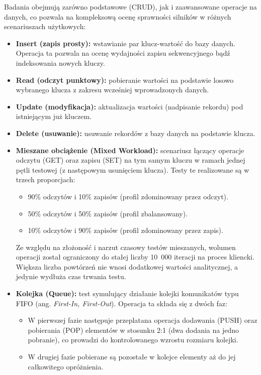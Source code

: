 Badania obejmują zarówno podstawowe (CRUD), jak i zaawansowane operacje na danych, co pozwala na kompleksową ocenę sprawności silników w różnych scenariuszach użytkowych:
\begin{itemize}
    \item \textbf{Insert (zapis prosty):} wstawianie par klucz-wartość do bazy danych. Operacja ta pozwala na ocenę wydajności zapisu sekwencyjnego bądź indeksowania nowych kluczy.
    \item \textbf{Read (odczyt punktowy):} pobieranie wartości na podstawie losowo wybranego klucza z zakresu wcześniej wprowadzonych danych.
    \item \textbf{Update (modyfikacja):} aktualizacja wartości (nadpisanie rekordu) pod istniejącym już kluczem.
    \item \textbf{Delete (usuwanie):} usuwanie rekordów z bazy danych na podstawie klucza.
    \item \textbf{Mieszane obciążenie (Mixed Workload):} scenariusz łączący operacje odczytu (GET) oraz zapisu (SET) na tym samym kluczu w ramach jednej pętli testowej (z następowym usunięciem klucza). Testy te realizowane są w trzech proporcjach:
    \begin{itemize}
        \item 90\% odczytów i 10\% zapisów (profil zdominowany przez odczyt).
        \item 50\% odczytów i 50\% zapisów (profil zbalansowany).
        \item 10\% odczytów i 90\% zapisów (profil zdominowany przez zapis).
    \end{itemize}
    Ze względu na złożoność i narzut czasowy testów mieszanych, wolumen operacji został ograniczony do stałej liczby 10~000 iteracji na proces kliencki. Większa liczba powtórzeń nie wnosi dodatkowej wartości analitycznej, a jedynie wydłuża czas trwania testu.
    \item \textbf{Kolejka (Queue):} test symulujący działanie kolejki komunikatów typu FIFO (ang. \emph{First-In, First-Out}). Operacja ta składa się z dwóch faz:
    \begin{itemize}
        \item W pierwszej fazie następuje przeplatana operacja dodawania (PUSH) oraz pobierania (POP) elementów w stosunku 2:1 (dwa dodania na jedno pobranie), co prowadzi do kontrolowanego wzrostu rozmiaru kolejki.
        \item W drugiej fazie pobierane są pozostałe w kolejce elementy aż do jej całkowitego opróżnienia.
    \end{itemize}

\end{itemize}
